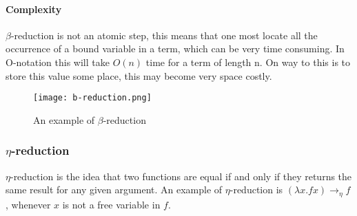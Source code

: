 \paragraph{Complexity}
$\beta$-reduction is not an atomic step, this means that one most locate all the occurrence of a bound variable in a term, which can be very time consuming. In O-notation this will take $O(n)$ time for a term of length n. On way to this is to store this value some place, this may become very space costly. 

\begin{figure}
    \centering
    \texttt{[image: b-reduction.png]}
    \caption{An example of $\beta$-reduction}
    \label{fig:beta-reduction}
\end{figure}

\subsubsection{$\eta$-reduction}
$\eta$-reduction is the idea that two functions are equal if and only if they returns the same result for 
any given argument. An example of $\eta$-reduction is $(\lambda x.f x)  \rightarrow_\eta f$, whenever $x$ is not 
a free variable in $f$.

